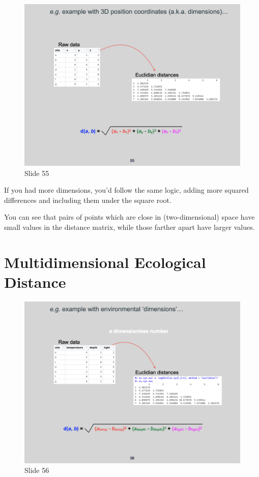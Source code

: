 \documentclass[
  12pt,
]{book}
\begin{document}
\begin{figure}[ht]
\centering
\includegraphics[width=0.8\linewidth]{../images/BDC334/BDC334-055.jpeg}
\caption*{Slide 55}
\end{figure}

If you had more dimensions, you'd follow the same logic, adding more
squared differences and including them under the square root.

You can see that pairs of points which are close in (two-dimensional)
space have small values in the distance matrix, while those farther
apart have larger values.

\section{Multidimensional Ecological
Distance}\label{multidimensional-ecological-distance}

\begin{figure}[ht]
\centering
\includegraphics[width=0.8\linewidth]{../images/BDC334/BDC334-056.jpeg}
\caption*{Slide 56}
\end{figure}
\end{document}
